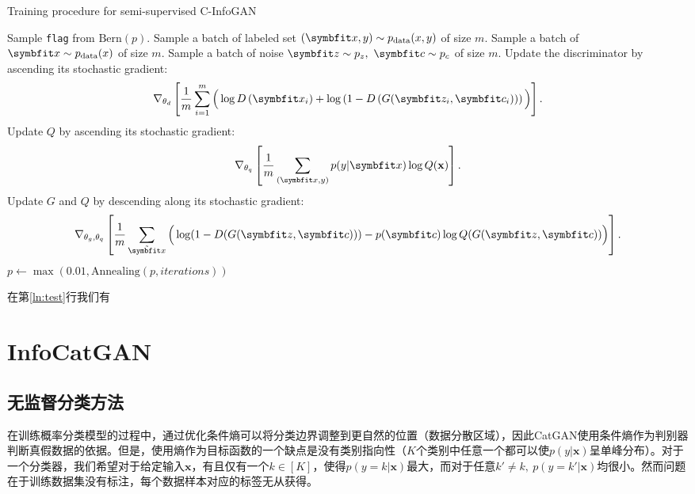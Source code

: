 \begin{algorithm}[htbp]
  \small
  \caption{Training procedure for semi-supervised C-InfoGAN}
  \label{alg:ss-cig}
  \begin{algorithmic}[1]
      \State Sample \texttt{flag} from $\text{Bern}(p)$.
        \State Sample a batch of labeled set 
               $(\bd{x}, y) \sim p_{\text{data}}(x,y)$ of size $m$.
      \Else
        \State Sample a batch of $\bd{x} \sim p_{\text{data}}(x)$ of
        size $m$.
      \EndIf
      \State Sample a batch of noise $\bd{z}\sim p_z, ~\bd{c}\sim p_c$ of size
      $m$.
      \State Update the discriminator by ascending its stochastic gradient:
      \[
        \nabla_{\theta_d} \left[ 
          \frac{1}{m} \sum_{i=1}^m \Big( 
            \log D\left(\bd{x}_i\right) + 
            \log\left( 1 - D\left( G(\bd{z}_i, \bd{c}_i) \right) \right)
          \Big)
        \right].
      \]
        \State Update $Q$ by ascending its stochastic gradient:
        \[
          \nabla_{\theta_q} \left[ 
            \frac{1}{m} \sum_{(\bd{x}, y)} p(y|\bd{x}) \log Q(\bf{x}) 
          \right].
        \]
      \EndIf
      \State Update $G$ and $Q$ by descending along its stochastic gradient:
      \[
        \nabla_{\theta_g,\theta_q} \left[ 
          \frac{1}{m} \sum_{\tilde{\bd{x}}} \Big(
            \log(1 - D(G(\bd{z},\bd{c}))) -
            p(\bd{c})\log Q(G(\bd{z}, \bd{c}))
          \Big)
        \right]. \label{ln:test}
      \]
      \State $p \gets \max(0.01, \text{Annealing}(p, iterations))$ 
    \EndFor
  \end{algorithmic}
\end{algorithm}

在第\ref{ln:test}行我们有


\section{InfoCatGAN}\label{sec:icg}
\subsection{无监督分类方法}\label{sec:icg-us}
在训练概率分类模型的过程中，通过优化条件熵可以将分类边界调整到更自然的位置（数据分散区域）\cite{grandvalet2005semi}，因此CatGAN使用条件熵作为判别器判断真假数据的依据。但是，使用熵作为目标函数的一个缺点是没有类别指向性（$K$个类别中任意一个都可以使$p(y|\mathbf{x})$呈单峰分布）。对于一个分类器，我们希望对于给定输入$\mathbf{x}$，有且仅有一个$k \in [K]$，使得$p(y=k|\mathbf{x})$最大，而对于任意$k' \neq k, ~p(y=k'|\mathbf{x})$均很小。然而问题在于训练数据集没有标注，每个数据样本对应的标签无从获得。

